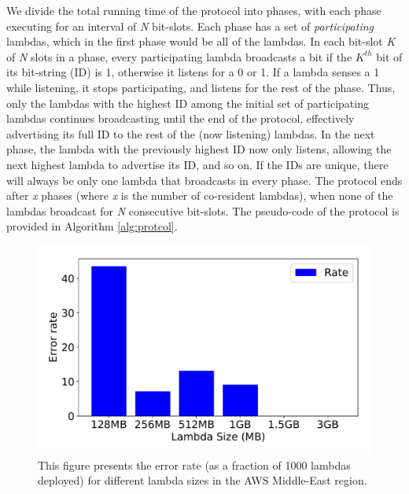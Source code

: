 We divide the total running time of the protocol into phases, with each phase
executing for an interval of \textit{N} bit-slots. Each phase has a set of
\textit{participating} lambdas, which in the first phase would be all of the
lambdas. In each bit-slot \textit{K} of \textit{N} slots in a phase, every
participating lambda broadcasts a bit if the $K^{th}$ bit of its bit-string (ID)
is 1, otherwise it listens for a 0 or 1. If a lambda senses a 1 while
listening, it stops participating, and listens for the rest of the phase. Thus,
only the lambdas with the highest ID among the initial set of participating
lambdas continues broadcasting until the end of the protocol, effectively
advertising its full ID to the rest of the (now listening) lambdas. In the next
phase, the lambda with the previously highest ID now only listens, allowing the
next highest lambda to advertise its ID, and so on.  If the IDs are unique,
there will always be only one lambda that broadcasts in every phase. The
protocol ends after \textit{x} phases (where \textit{x} is the number of co-resident
lambdas), when none of the lambdas broadcast for \textit{N} consecutive
bit-slots. The pseudo-code of the protocol is provided in Algorithm
\ref{alg:protcol}. 

\begin{figure}[!t]
  \includegraphics[width=.99\linewidth]{fig/errorrates.pdf}
  \caption{This figure presents the error rate (as a fraction of 1000 lambdas
  deployed) for different lambda sizes in the AWS Middle-East region.
\label{fig:errorrates}}
\end{figure}

